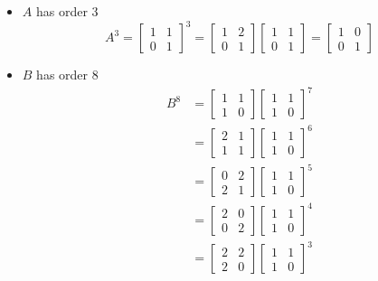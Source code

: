 \documentclass[12pt, letterpaper]{article}
\begin{document}
\begin{enumerate}
	\begin{itemize}
		\item $A$ has order 3\\
		$$
		A^3 = \begin{bmatrix}1 & 1\\ 0 & 1\end{bmatrix}^3 = \begin{bmatrix}1 & 2\\ 0 & 1\end{bmatrix} \begin{bmatrix}1 & 1\\ 0 & 1\end{bmatrix} = \begin{bmatrix}1 & 0\\ 0 & 1\end{bmatrix}
		$$
		\item $B$ has order 8\\
		\begin{align*}
		B^8 &= \begin{bmatrix}1 & 1\\ 1 & 0\end{bmatrix} \begin{bmatrix}1 & 1\\ 1 & 0\end{bmatrix}^7\\
		&= \begin{bmatrix}2 & 1\\ 1 & 1\end{bmatrix} \begin{bmatrix}1 & 1\\ 1 & 0\end{bmatrix}^6\\
		&= \begin{bmatrix}0 & 2\\ 2 & 1\end{bmatrix} \begin{bmatrix}1 & 1\\ 1 & 0\end{bmatrix}^5\\
		&= \begin{bmatrix}2 & 0\\ 0 & 2\end{bmatrix} \begin{bmatrix}1 & 1\\ 1 & 0\end{bmatrix}^4\\
		&= \begin{bmatrix}2 & 2\\ 2 & 0\end{bmatrix} \begin{bmatrix}1 & 1\\ 1 & 0\end{bmatrix}^3\\

\end{align*}
\end{itemize}
\end{enumerate}
\end{document}
